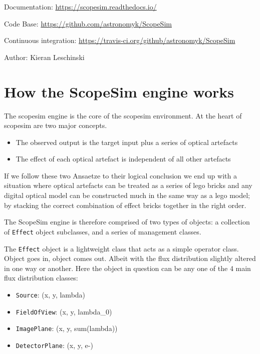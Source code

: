 
Documentation: \url{https://scopesim.readthedocs.io/}

Code Base: \url{https://github.com/astronomyk/ScopeSim}

Continuous integration: \url{https://travis-ci.org/github/astronomyk/ScopeSim}

Author: Kieran Leschinski


\section{How the ScopeSim engine works%
  \label{how-the-scopesim-engine-works}%
}

The scopesim engine is the core of the scopesim environment.
At the heart of scopesim are two major concepts.

\begin{itemize}
\item The observed output is the target input plus a series of optical artefacts

\item The effect of each optical artefact is independent of all other artefacts
\end{itemize}

If we follow these two Ansaetze to their logical conclusion we end up with a situation where optical artefacts can be treated as a series of \textquotedbl{}lego bricks\textquotedbl{} and any digital optical model can be constructed much in the same way as a lego model; by stacking the correct combination of effect \textquotedbl{}bricks\textquotedbl{} together in the right order.

The ScopeSim engine is therefore comprised of two types of objects: a collection of \texttt{Effect} object subclasses, and a series of \textquotedbl{}management\textquotedbl{} classes.

The \texttt{Effect} object is a lightweight class that acts as a simple operator class.
Object goes in, object comes out.
Albeit with the flux distribution slightly altered in one way or another.
Here the object in question can be any one of the 4 main flux distribution classes:

\begin{itemize}
\item \texttt{Source}: (x, y, lambda)

\item \texttt{FieldOfView}: (x, y, lambda\_0)

\item \texttt{ImagePlane}: (x, y, sum(lambda))

\item \texttt{DetectorPlane}: (x, y, e-)
\end{itemize}

